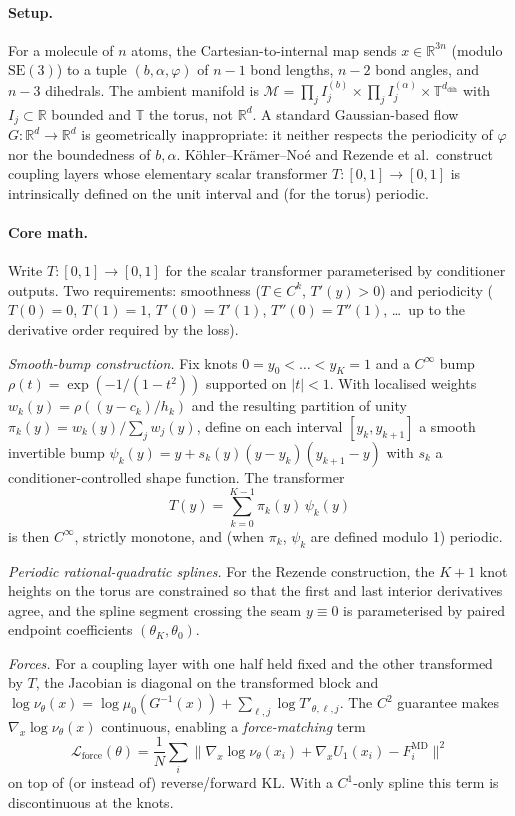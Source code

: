\documentclass[11pt,letterpaper]{article}
\newcommand{\Real}{\mathbb{R}}
\theoremstyle{plain}
\begin{document}
\paragraph{Setup.} For a molecule of $n$ atoms, the Cartesian-to-internal map sends $x\in\Real^{3n}$ (modulo $\mathrm{SE}(3)$) to a tuple $(b,\alpha,\varphi)$ of $n-1$ bond lengths, $n-2$ bond angles, and $n-3$ dihedrals. The ambient manifold is $\mathcal M = \prod_j I_j^{(b)}\times\prod_j I_j^{(\alpha)}\times\mathbb T^{d_{\mathrm{dih}}}$ with $I_j\subset\Real$ bounded and $\mathbb T$ the torus, not $\Real^d$. A standard Gaussian-based flow $G:\Real^d\to\Real^d$ is geometrically inappropriate: it neither respects the periodicity of $\varphi$ nor the boundedness of $b,\alpha$. Köhler--Krämer--Noé and Rezende et al.\ construct coupling layers whose elementary scalar transformer $T:[0,1]\to[0,1]$ is intrinsically defined on the unit interval and (for the torus) periodic.

\paragraph{Core math.} Write $T:[0,1]\to[0,1]$ for the scalar transformer parameterised by conditioner outputs. Two requirements: smoothness ($T\in C^k$, $T'(y)>0$) and periodicity ($T(0)=0$, $T(1)=1$, $T'(0)=T'(1)$, $T''(0)=T''(1)$, \ldots~up to the derivative order required by the loss).

\emph{Smooth-bump construction.} Fix knots $0=y_0<\dots<y_K=1$ and a $C^\infty$ bump $\rho(t)=\exp(-1/(1-t^2))$ supported on $|t|<1$. With localised weights $w_k(y)=\rho((y-c_k)/h_k)$ and the resulting partition of unity $\pi_k(y)=w_k(y)/\sum_j w_j(y)$, define on each interval $[y_k,y_{k+1}]$ a smooth invertible bump $\psi_k(y)=y+s_k(y)(y-y_k)(y_{k+1}-y)$ with $s_k$ a conditioner-controlled shape function. The transformer
\[
  T(y)=\sum_{k=0}^{K-1}\pi_k(y)\,\psi_k(y)
\]
is then $C^\infty$, strictly monotone, and (when $\pi_k$, $\psi_k$ are defined modulo 1) periodic.

\emph{Periodic rational-quadratic splines.} For the Rezende construction, the $K+1$ knot heights on the torus are constrained so that the first and last interior derivatives agree, and the spline segment crossing the seam $y\equiv 0$ is parameterised by paired endpoint coefficients $(\theta_K,\theta_0)$.

\emph{Forces.} For a coupling layer with one half held fixed and the other transformed by $T$, the Jacobian is diagonal on the transformed block and $\log\nu_\theta(x)=\log\mu_0(G^{-1}(x))+\sum_{\ell,j}\log T'_{\theta,\ell,j}$. The $C^2$ guarantee makes $\nabla_x\log\nu_\theta(x)$ continuous, enabling a \emph{force-matching} term
\[
  \mathcal L_{\mathrm{force}}(\theta) = \frac{1}{N}\sum_i \|\nabla_x\log\nu_\theta(x_i)+\nabla_x U_1(x_i)-F_i^{\mathrm{MD}}\|^2
\]
on top of (or instead of) reverse/forward KL. With a $C^1$-only spline this term is discontinuous at the knots.
\end{document}
